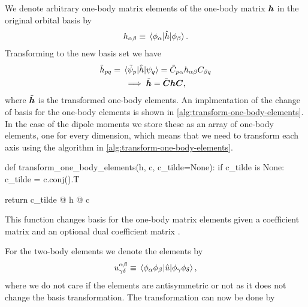         We denote arbitrary one-body matrix elements of the one-body matrix
        $\boldsymbol{h}$ in the original orbital basis by
        \begin{align}
            h_{\alpha \beta}
            \equiv
            \mel*{\phi_{\alpha}}{\hat{h}}{\phi_{\beta}}.
        \end{align}
        Transforming to the new basis set we have
        \begin{gather}
            \tilde{h}_{pq}
            = \mel*{\tilde{\psi}_p}{\hat{h}}{\psi_q}
            =
            \tilde{C}_{p\alpha}
            h_{\alpha \beta}
            C_{\beta q}
            \\
            \implies
            \tilde{\boldsymbol{h}}
            = \tilde{\boldsymbol{C}}
            \boldsymbol{h}
            \boldsymbol{C},
        \end{gather}
        where $\tilde{\boldsymbol{h}}$ is the transformed one-body elements.
        An implmentation of the change of basis for the one-body elements is
        shown in \autoref{alg:transform-one-body-elements}.
        In the case of the dipole moments we store these as an array of one-body
        elements, one for every dimension, which means that we need to transform
        each axis using the algorithm in
        \autoref{alg:transform-one-body-elements}.
        \begin{algorithm}
            \begin{python}
def transform_one_body_elements(h, c, c_tilde=None):
    if c_tilde is None:
        c_tilde = c.conj().T

    return c_tilde @ h @ c
            \end{python}
            \caption{This function changes basis for the one-body matrix
            elements given a coefficient matrix  and an optional dual
            coefficient matrix .}
            \label{alg:transform-one-body-elements}
        \end{algorithm}
        For the two-body elements we denote the elements by
        \begin{align}
            u^{\alpha\beta}_{\gamma\delta}
            \equiv
            \mel*{\phi_{\alpha}\phi_{\beta}}{
                \hat{u}
            }{\phi_{\gamma}\phi_{\delta}},
        \end{align}
        where we do not care if the elements are antisymmetric or not as it does
        not change the basis transformation.
        The transformation can now be done by
